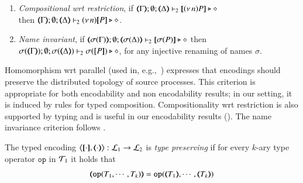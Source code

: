 \documentclass[runningheads]{llncs}
\begin{document}
{\begin{definition}
\begin{enumerate}[1.]
		\item	\emph{Compositional wrt restriction},  if 
		$\mapt{\Gamma}; \emptyset; \mapt{\Delta} \proves_2 \map{\news{n}P} \hastype \Proc$ \\
		then 
		$\mapt{\Gamma}; \emptyset; \mapt{\Delta} \proves_2 \news{n}\map{P} \hastype \Proc$.
		
		\item \emph{Name invariant},   if
		$\mapt{\sigma(\Gamma)}; \emptyset; \mapt{\sigma(\Delta)} \proves_2 \map{\sigma(P)} \hastype \Proc$
		then \\
		$\sigma(\mapt{\Gamma}); \emptyset; \sigma(\mapt{\Delta}) \proves_2 \sigma(\map{P}) \hastype \Proc$, 
		for any injective renaming  of names $\sigma$.
	\end{enumerate}
\end{definition}


Homomorphism wrt parallel (used in, e.g.,~\cite{Palamidessi03,DBLP:conf/lics/PalamidessiSVV06})
expresses that encodings should preserve the distributed topology of source processes. This criterion
 is appropriate for both encodability and non encodability results; in our setting, it is
induced by rules for typed composition.
Compositionality wrt restriction 
is also supported by typing and is 
useful in our encodability results ().
The name invariance criterion follows \cite{DBLP:journals/iandc/Gorla10,DBLP:conf/icalp/LanesePSS10}. 


\begin{definition}
	\label{def:tp}
	The typed encoding 
	$\enco{\map{\cdot}, \mapt{\cdot}}: \tyl{L}_1 \to \tyl{L}_2$ is \emph{type preserving}
	if for every $k$-ary type operator $\mathtt{op}$ in ${\cal{T}}_1$ it holds that 
	 $$\mapt{\mathtt{op}(T_1, \cdots, T_k)} = \mathtt{op}(\mapt{T_1}, \cdots, \mapt{T_k})$$
	\end{definition}


}
\end{document}
